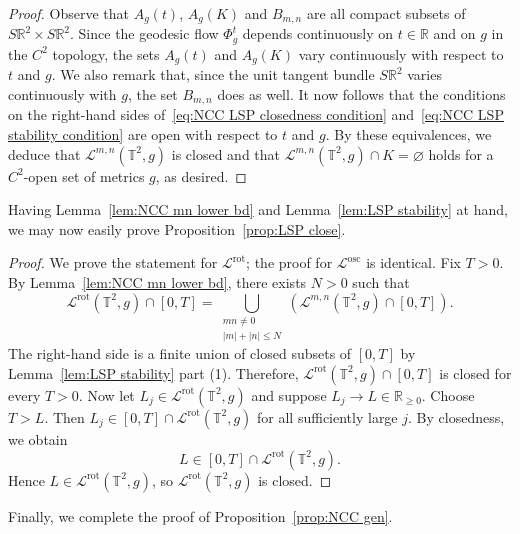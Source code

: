 \documentclass[11pt,letterpaper,oneside]{amsart}
\newcommand{\R}{\mathbb{R}}
\newcommand{\T}{\mathbb{T}}
\theoremstyle{definition}
\theoremstyle{remark}
\theoremstyle{definition}
\theoremstyle{remark}
\newcommand{\CL}{\mathcal{L}}
\DeclareMathOperator{\rot}{rot}
\DeclareMathOperator{\osc}{osc}
\begin{document}
\begin{proof}
    Observe that $A_g(t)$, $A_g(K)$ and $B_{m,n}$ are all compact subsets of $S\R^2 \times S\R^2$. Since the geodesic flow $\Phi^t_g$ depends continuously on $t \in \R$ and on $g$ in the $C^2$ topology, the sets $A_g(t)$ and $A_g(K)$ vary continuously with respect to $t$ and $g$. 
    We also remark that, since the unit tangent bundle $S\R^2$ varies continuously with $g$, the set $B_{m,n}$ does as well. 
    It now follows that the conditions on the right-hand sides of~\eqref{eq:NCC LSP closedness condition} and~\eqref{eq:NCC LSP stability condition} are open with respect to $t$ and $g$.
    By these equivalences, we deduce that $\CL^{m,n}(\T^2, g)$ is closed and that $\CL^{m,n}(\T^2, g) \cap K = \varnothing$ holds for a $C^2$-open set of metrics $g$, as desired.
\end{proof}


Having Lemma~\ref{lem:NCC mn lower bd} and Lemma~\ref{lem:LSP stability} at hand, we may now easily prove Proposition~\ref{prop:LSP close}.

\begin{proof}
We prove the statement for $\CL^{\rot}$; the proof for $\CL^{\osc}$ is identical.
Fix $T>0$. By Lemma~\ref{lem:NCC mn lower bd}, there exists $N>0$ such that
\[
    \CL^{\rot}(\T^2,g)\cap[0,T]
    =
    \bigcup_{\substack{mn\neq 0\\ |m|+|n|\leq N}}
    \left(
        \CL^{m,n}(\T^2,g)\cap[0,T]
    \right).
\]
The right-hand side is a finite union of closed subsets of $[0,T]$ by Lemma~\ref{lem:LSP stability} part (1). 
Therefore, $\CL^{\rot}(\T^2,g)\cap[0,T]$ is closed for every $T > 0$.
Now let $L_j\in\CL^{\rot}(\T^2,g)$ and suppose $L_j\to L\in\R_{\geq 0}$. Choose $T>L$. Then $L_j\in[0,T]\cap\CL^{\rot}(\T^2,g)$ for all sufficiently large $j$. By closedness, we obtain
\[
    L\in [0,T]\cap\CL^{\rot}(\T^2,g).
\]
Hence $L\in\CL^{\rot}(\T^2,g)$, so $\CL^{\rot}(\T^2,g)$ is closed.
\end{proof}


Finally, we complete the proof of Proposition~\ref{prop:NCC gen}.
\end{document}

